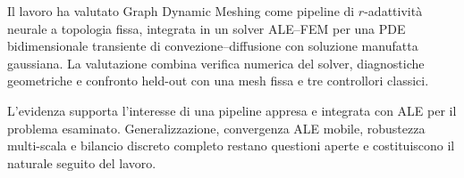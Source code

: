 Il lavoro ha valutato Graph Dynamic Meshing come pipeline di $r$-adattività neurale a topologia fissa, integrata in un solver ALE--FEM per una PDE bidimensionale transiente di convezione--diffusione con soluzione manufatta gaussiana. La valutazione combina verifica numerica del solver, diagnostiche geometriche e confronto held-out con una mesh fissa e tre controllori classici.

L'evidenza supporta l'interesse di una pipeline appresa e integrata con ALE per il problema esaminato. Generalizzazione, convergenza ALE mobile, robustezza multi-scala e bilancio discreto completo restano questioni aperte e costituiscono il naturale seguito del lavoro.
